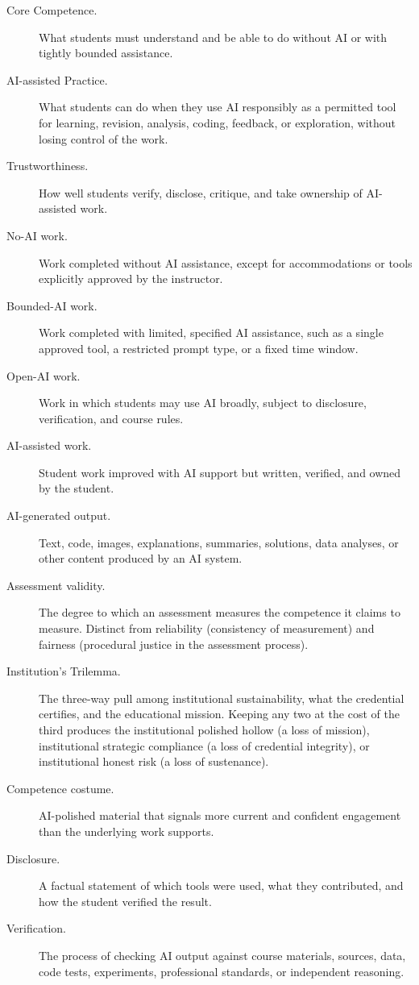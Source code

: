 \documentclass{SIAMbook2023}
\begin{document}
\begin{description}
  \item[Core Competence.] What students must understand and be able to do without AI or with tightly bounded assistance.
  \item[AI-assisted Practice.] What students can do when they use AI responsibly as a permitted tool for learning, revision, analysis, coding, feedback, or exploration, without losing control of the work.
  \item[Trustworthiness.] How well students verify, disclose, critique, and take ownership of AI-assisted work.
  \item[No-AI work.] Work completed without AI assistance, except for accommodations or tools explicitly approved by the instructor.
  \item[Bounded-AI work.] Work completed with limited, specified AI assistance, such as a single approved tool, a restricted prompt type, or a fixed time window.
  \item[Open-AI work.] Work in which students may use AI broadly, subject to disclosure, verification, and course rules.
  \item[AI-assisted work.] Student work improved with AI support but written, verified, and owned by the student.
  \item[AI-generated output.] Text, code, images, explanations, summaries, solutions, data analyses, or other content produced by an AI system.
  \item[Assessment validity.] The degree to which an assessment measures the competence it claims to measure. Distinct from reliability (consistency of measurement) and fairness (procedural justice in the assessment process).
  \item[Institution's Trilemma.] The three-way pull among institutional sustainability, what the credential certifies, and the educational mission. Keeping any two at the cost of the third produces the institutional polished hollow (a loss of mission), institutional strategic compliance (a loss of credential integrity), or institutional honest risk (a loss of sustenance).
  \item[Competence costume.] AI-polished material that signals more current and confident engagement than the underlying work supports.
  \item[Disclosure.] A factual statement of which tools were used, what they contributed, and how the student verified the result.
  \item[Verification.] The process of checking AI output against course materials, sources, data, code tests, experiments, professional standards, or independent reasoning.

\end{description}
\end{document}
